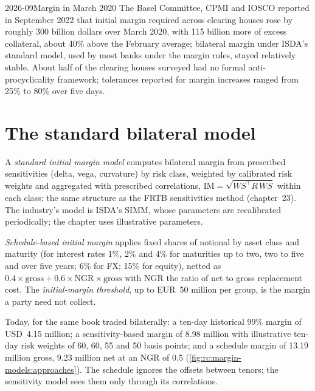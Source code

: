 \begin{dated}{2026-09}{Margin in March 2020}\label{dat:rc:margin-models:march2020}
The Basel Committee, CPMI and IOSCO reported in September 2022 that initial margin required across
clearing houses rose by roughly 300 billion dollars over March 2020, with 115 billion more of excess
collateral, about 40\% above the February average; bilateral margin under ISDA's standard model, used
by most banks under the margin rules, stayed relatively stable. About half of the clearing houses
surveyed had no formal anti-procyclicality framework; tolerances reported for margin increases ranged
from 25\% to 80\% over five days.
\end{dated}

\section{The standard bilateral model}

\begin{definition}\label{def:rc:margin-models:simm}
A \emph{standard initial margin model} computes bilateral margin
from prescribed sensitivities (delta, vega, curvature) by risk class, weighted by calibrated risk
weights and aggregated with prescribed correlations, $\mathrm{IM} = \sqrt{WS^\top R\,WS}$ within each class: the
same structure as the FRTB sensitivities method (chapter~23). The industry's model is ISDA's SIMM,
whose parameters are recalibrated periodically; the chapter uses illustrative parameters.
\end{definition}

\begin{definition}\label{def:rc:margin-models:schedule}
\emph{Schedule-based initial margin} applies fixed shares of
notional by asset class and maturity (for interest rates 1\%, 2\% and 4\% for maturities up to two, two
to five and over five years; 6\% for FX; 15\% for equity), netted as $0.4\times\text{gross}+0.6\times\mathrm{NGR}\times\text{gross}$
with NGR the ratio of net to gross replacement cost. The \emph{initial-margin
threshold}, up to EUR~50 million per group, is the margin a party need
not collect.
\end{definition}

\begin{example}\label{ex:rc:margin-models:bilateral}
Today, for the same book traded bilaterally: a ten-day historical 99\% margin of USD~4.15 million; a
sensitivity-based margin of 8.98 million with illustrative ten-day risk weights of 60, 60, 55 and 50
basis points; and a schedule margin of 13.19 million gross, 9.23 million net at an NGR of 0.5
(\cref{fig:rc:margin-models:approaches}). The schedule ignores the offsets between tenors; the
sensitivity model sees them only through its correlations.
\end{example}

